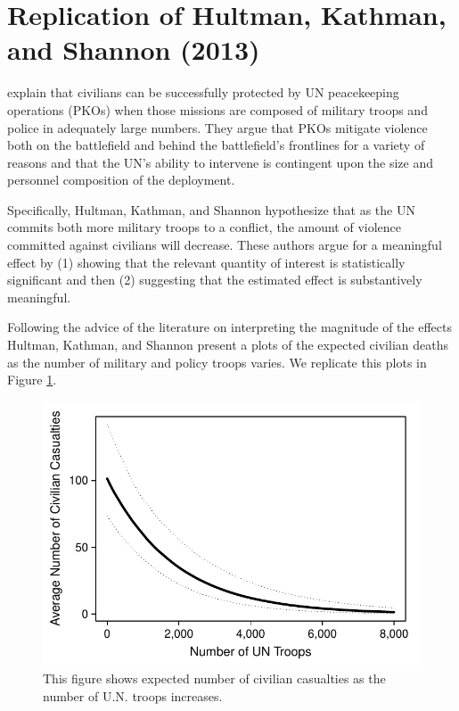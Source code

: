 \documentclass[12pt]{article}
\begin{document}
\section*{Replication of Hultman, Kathman, and Shannon (2013)}

\cite{HultmanKathmanShannon2013} explain that civilians can be successfully protected by UN peacekeeping operations (PKOs) when those missions are composed of military troops and police in adequately large numbers. They argue that PKOs mitigate violence both on the battlefield and behind the battlefield's frontlines for a variety of reasons and that the UN's ability to intervene is contingent upon the size and personnel composition of the deployment.

Specifically, Hultman, Kathman, and Shannon hypothesize that as the UN commits both more military troops to a conflict, the amount of violence committed against civilians will decrease. These authors argue for a meaningful effect by (1) showing that the relevant quantity of interest is statistically significant and then (2) suggesting that the estimated effect is substantively meaningful.

Following the advice of the literature on interpreting the magnitude of the effects Hultman, Kathman, and Shannon present a plots of the expected civilian deaths as the number of military and policy troops varies. We replicate this plots in Figure \ref{fig:hks-ev}.

\begin{figure}[H]
\begin{center}
\includegraphics[scale = .8]{figs/hks-ev.pdf}
\caption{This figure shows expected number of civilian casualties as the number of U.N. troops increases.}\label{fig:hks-ev}
\end{center}
\end{figure}
\end{document}
